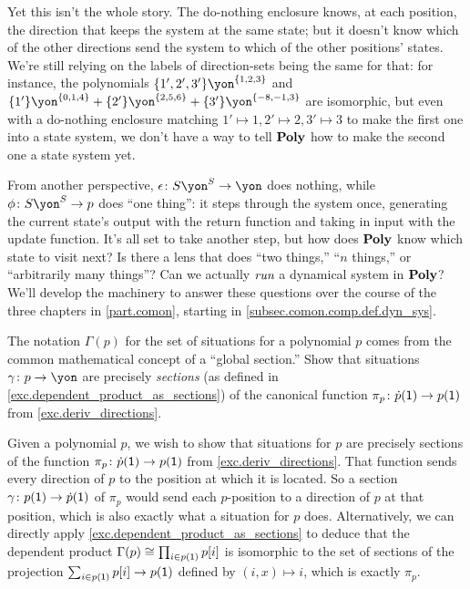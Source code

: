\documentclass[Book-Poly]{subfiles}
\begin{document}
\begin{example}
Yet this isn't the whole story.
The do-nothing enclosure knows, at each position, the direction that keeps the system at the same state; but it doesn't know which of the other directions send the system to which of the other positions' states.
We're still relying on the labels of direction-sets being the same for that: for instance, the polynomials $\{1',2',3'\}\yon^{\{1,2,3\}}$ and $\{1'\}\yon^{\{0,1,4\}}+\{2'\}\yon^{\{2,5,6\}}+\{3'\}\yon^{\{-8,-1,3\}}$ are isomorphic, but even with a do-nothing enclosure matching $1'\mapsto1,2'\mapsto2,3'\mapsto3$ to make the first one into a state system, we don't have a way to tell $\mathbf{Poly}$ how to make the second one a state system yet.

From another perspective, $\epsilon\colon S\yon^S\to\yon$ does nothing, while $\phi\colon S\yon^S\to p$ does ``one thing'': it steps through the system once, generating the current state's output with the return function and taking in input with the update function.
It's all set to take another step, but how does $\mathbf{Poly}$ know which state to visit next?
Is there a lens that does ``two things,'' ``$n$ things,'' or ``arbitrarily many things''?
Can we actually $\emph{run}$ a dynamical system in $\mathbf{Poly}$?
We'll develop the machinery to answer these questions over the course of the three chapters in \cref{part.comon}, starting in \cref{subsec.comon.comp.def.dyn_sys}.
\end{example}

\begin{exercise}
The notation $\Gamma(p)$ for the set of situations for a polynomial $p$ comes from the common mathematical concept of a ``global section.''
Show that situations $\gamma\colon p\to\yon$ are precisely \emph{sections} (as defined in \cref{exc.dependent_product_as_sections}) of the canonical function $\pi_p\colon\dot{p}(\textsf{1})\to p(\textsf{1})$ from \cref{exc.deriv_directions}.
\begin{solution}
Given a polynomial $p$, we wish to show that situations for $p$ are precisely sections of the function $\pi_p\colon\dot{p}(\textsf{1})\to p(\textsf{1})$ from \cref{exc.deriv_directions}.
That function sends every direction of $p$ to the position at which it is located.
So a section $\gamma\colon p(\textsf{1})\to\dot{p}(\textsf{1})$ of $\pi_p$ would send each $p$-position to a direction of $p$ at that position, which is also exactly what a situation for $p$ does.
Alternatively, we can directly apply \cref{exc.dependent_product_as_sections} to deduce that the dependent product $\Gamma(p)\cong\prod_{i \in p(\textsf{1})}p[i]$ is isomorphic to the set of sections of the projection $\sum_{i\in p(\textsf{1})}p[i]\to p(\textsf{1})$ defined by $(i,x)\mapsto i$, which is exactly $\pi_p$.
\end{solution}
\end{exercise}
\end{document}
